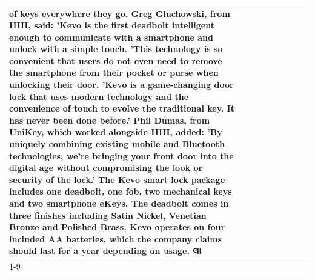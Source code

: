 \begin{table}[H]
\begin{tabular}{lllrlllll}
of keys everywhere they go. Greg Gluchowski, from HHI, said: 'Kevo is the first deadbolt intelligent enough to communicate with a smartphone and unlock with a simple touch. 'This technology is so convenient that users do not even need to remove the smartphone from their pocket or purse when unlocking their door. 'Kevo is a game-changing door lock that uses modern technology and the convenience of touch to evolve the traditional key. It has never been done before.' Phil Dumas, from UniKey, which worked alongside HHI, added: 'By uniquely combining existing mobile and Bluetooth technologies, we’re bringing your front door into the digital age without compromising the look or security of the lock.' The Kevo smart lock package includes one deadbolt, one fob, two mechanical keys and two smartphone eKeys. The deadbolt comes in three finishes including Satin Nickel, Venetian Bronze and Polished Brass. Kevo operates on four included AA batteries, which the company claims should last for a year depending on usage. લા \\
\cline{1-9}

\end{tabular}
\end{table}
